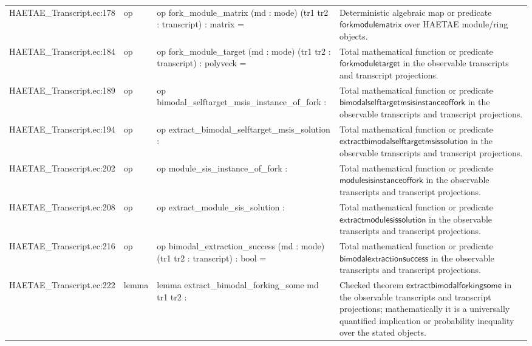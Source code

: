 \documentclass[10pt]{article}
\begin{document}
\begin{longtable}{L{0.11\textwidth}L{0.055\textwidth}L{0.385\textwidth}L{0.41\textwidth}}
HAETAE\_\allowbreak{}Transcript.\allowbreak{}ec:\allowbreak{}178 & op & {\ttfamily\scriptsize op fork\_\allowbreak{}module\_\allowbreak{}matrix (md : mode) (tr1 tr2 : transcript) : matrix =} & Deterministic algebraic map or predicate $\mathsf{forkmodulematrix}$ over HAETAE module/ring objects. \\
HAETAE\_\allowbreak{}Transcript.\allowbreak{}ec:\allowbreak{}184 & op & {\ttfamily\scriptsize op fork\_\allowbreak{}module\_\allowbreak{}target (md : mode) (tr1 tr2 : transcript) : polyveck =} & Total mathematical function or predicate $\mathsf{forkmoduletarget}$ in the observable transcripts and transcript projections. \\
HAETAE\_\allowbreak{}Transcript.\allowbreak{}ec:\allowbreak{}189 & op & {\ttfamily\scriptsize op bimodal\_\allowbreak{}selftarget\_\allowbreak{}msis\_\allowbreak{}instance\_\allowbreak{}of\_\allowbreak{}fork :} & Total mathematical function or predicate $\mathsf{bimodalselftargetmsisinstanceoffork}$ in the observable transcripts and transcript projections. \\
HAETAE\_\allowbreak{}Transcript.\allowbreak{}ec:\allowbreak{}194 & op & {\ttfamily\scriptsize op extract\_\allowbreak{}bimodal\_\allowbreak{}selftarget\_\allowbreak{}msis\_\allowbreak{}solution :} & Total mathematical function or predicate $\mathsf{extractbimodalselftargetmsissolution}$ in the observable transcripts and transcript projections. \\
HAETAE\_\allowbreak{}Transcript.\allowbreak{}ec:\allowbreak{}202 & op & {\ttfamily\scriptsize op module\_\allowbreak{}sis\_\allowbreak{}instance\_\allowbreak{}of\_\allowbreak{}fork :} & Total mathematical function or predicate $\mathsf{modulesisinstanceoffork}$ in the observable transcripts and transcript projections. \\
HAETAE\_\allowbreak{}Transcript.\allowbreak{}ec:\allowbreak{}208 & op & {\ttfamily\scriptsize op extract\_\allowbreak{}module\_\allowbreak{}sis\_\allowbreak{}solution :} & Total mathematical function or predicate $\mathsf{extractmodulesissolution}$ in the observable transcripts and transcript projections. \\
HAETAE\_\allowbreak{}Transcript.\allowbreak{}ec:\allowbreak{}216 & op & {\ttfamily\scriptsize op bimodal\_\allowbreak{}extraction\_\allowbreak{}success (md : mode) (tr1 tr2 : transcript) : bool =} & Total mathematical function or predicate $\mathsf{bimodalextractionsuccess}$ in the observable transcripts and transcript projections. \\
HAETAE\_\allowbreak{}Transcript.\allowbreak{}ec:\allowbreak{}222 & lemma & {\ttfamily\scriptsize lemma extract\_\allowbreak{}bimodal\_\allowbreak{}forking\_\allowbreak{}some md tr1 tr2 :} & Checked theorem $\mathsf{extractbimodalforkingsome}$ in the observable transcripts and transcript projections; mathematically it is a universally quantified implication or probability inequality over the stated objects. \\

\end{longtable}
\end{document}
